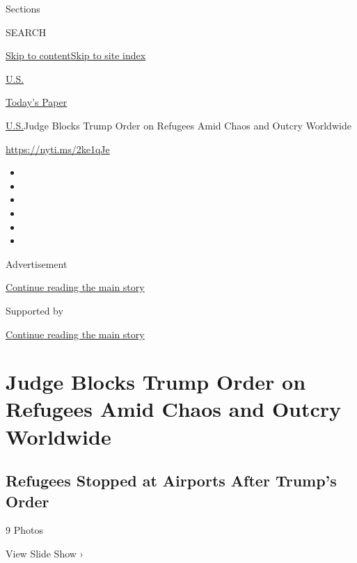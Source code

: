 Sections

SEARCH

\protect\hyperlink{site-content}{Skip to
content}\protect\hyperlink{site-index}{Skip to site index}

\href{https://www.nytimes.com/section/us}{U.S.}

\href{https://myaccount.nytimes.com/auth/login?response_type=cookie\&client_id=vi}{}

\href{https://www.nytimes.com/section/todayspaper}{Today's Paper}

\href{/section/us}{U.S.}\textbar{}Judge Blocks Trump Order on Refugees
Amid Chaos and Outcry Worldwide

\url{https://nyti.ms/2ke1qJe}

\begin{itemize}
\item
\item
\item
\item
\item
\item
\end{itemize}

Advertisement

\protect\hyperlink{after-top}{Continue reading the main story}

Supported by

\protect\hyperlink{after-sponsor}{Continue reading the main story}

\hypertarget{judge-blocks-trump-order-on-refugees-amid-chaos-and-outcry-worldwide}{%
\section{Judge Blocks Trump Order on Refugees Amid Chaos and Outcry
Worldwide}\label{judge-blocks-trump-order-on-refugees-amid-chaos-and-outcry-worldwide}}

\href{https://www.nytimes.com/slideshow/2017/01/28/us/refugees-stopped-at-airports-after-trumps-order.html}{}

\hypertarget{refugees-stopped-at-airports-after-trumps-order}{%
\subsection{Refugees Stopped at Airports After Trump's
Order}\label{refugees-stopped-at-airports-after-trumps-order}}

9 Photos

View Slide Show ›

